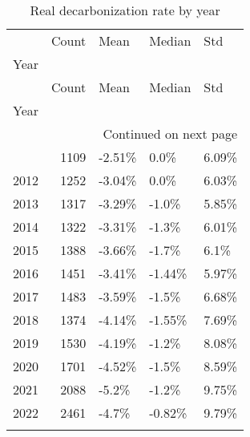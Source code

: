 \begin{longtable}{lrlll}
\toprule
 & Count & Mean & Median & Std \\
Year &  &  &  &  \\
\midrule
\endfirsthead
\toprule
 & Count & Mean & Median & Std \\
Year &  &  &  &  \\
\midrule
\endhead
\midrule
\multicolumn{5}{r}{Continued on next page} \\
\midrule
\endfoot
\bottomrule
\endlastfoot
2011 & 1109 & -2.51\% & 0.0\% & 6.09\% \\
2012 & 1252 & -3.04\% & 0.0\% & 6.03\% \\
2013 & 1317 & -3.29\% & -1.0\% & 5.85\% \\
2014 & 1322 & -3.31\% & -1.3\% & 6.01\% \\
2015 & 1388 & -3.66\% & -1.7\% & 6.1\% \\
2016 & 1451 & -3.41\% & -1.44\% & 5.97\% \\
2017 & 1483 & -3.59\% & -1.5\% & 6.68\% \\
2018 & 1374 & -4.14\% & -1.55\% & 7.69\% \\
2019 & 1530 & -4.19\% & -1.2\% & 8.08\% \\
2020 & 1701 & -4.52\% & -1.5\% & 8.59\% \\
2021 & 2088 & -5.2\% & -1.2\% & 9.75\% \\
2022 & 2461 & -4.7\% & -0.82\% & 9.79\% \\
\caption{Real decarbonization rate by year}
\label{tab:real-decarbonization-rate-breakdown-by-year}
\end{longtable}
